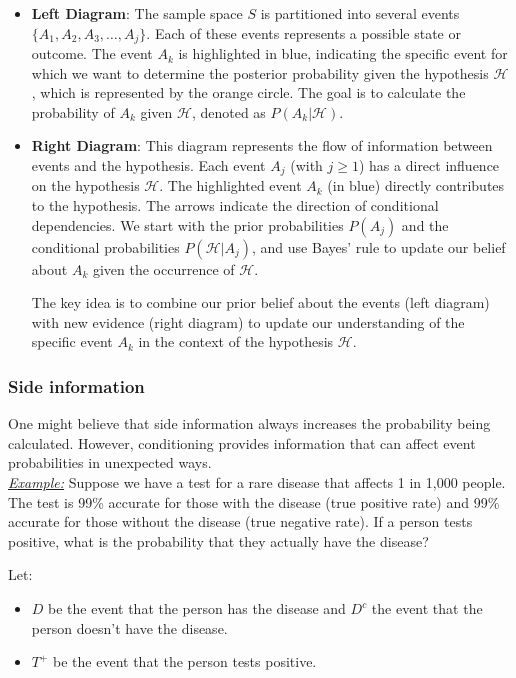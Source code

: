 \documentclass[a4paper,10pt]{article}
\newcommand{\hlti}[1]{\colorbox{color1}{#1}}
\begin{document}
\begin{itemize}
    \item \textbf{Left Diagram}: The sample space $ S $ is partitioned into several events $ \{A_1, A_2, A_3, \ldots, A_j\} $. Each of these events represents a possible state or outcome. The event $ A_k $ is highlighted in blue, indicating the specific event for which we want to determine the posterior probability given the hypothesis $ \mathcal{H} $, which is represented by the orange circle. The goal is to calculate the probability of $ A_k $ given $ \mathcal{H} $, denoted as $ P(A_k | \mathcal{H}) $.

    \item \textbf{Right Diagram}: This diagram represents the flow of information between events and the hypothesis. Each event $ A_j $ (with $ j \geq 1 $) has a direct influence on the hypothesis $ \mathcal{H} $. The highlighted event $ A_k $ (in blue) directly contributes to the hypothesis. The arrows indicate the direction of conditional dependencies. We start with the prior probabilities $ P(A_j) $ and the conditional probabilities $ P(\mathcal{H} | A_j) $, and use Bayes' rule to update our belief about $ A_k $ given the occurrence of $ \mathcal{H} $.

    The key idea is to combine our prior belief about the events (left diagram) with new evidence (right diagram) to update our understanding of the specific event $ A_k $ in the context of the hypothesis $ \mathcal{H} $.
\end{itemize}

\subsubsection{Side information}

One might believe that side information always increases the probability being calculated. However, conditioning provides information that can affect event probabilities in \hlti{unexpected} ways.\\

\noindent\textit{\underline{Example:}} Suppose we have a test for a rare disease that affects 1 in 1,000 people. The test is 99\% accurate for those with the disease (true positive rate) and 99\% accurate for those without the disease (true negative rate). If a person tests positive, what is the probability that they actually have the disease?

Let:
\begin{itemize}
    \item $D$ be the event that the person has the disease and $D^c$ the event that the person doesn't have the disease.
    \item $T^+$ be the event that the person tests positive.
\end{itemize}
\end{document}
